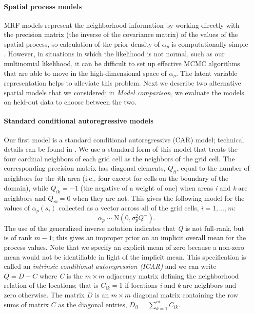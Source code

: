 \documentclass[10pt,letterpaper]{article}
\begin{document}
\paragraph*{Spatial process models}

MRF models represent the neighborhood information
by working directly with the precision matrix (the
inverse of the covariance matrix) of the values of the spatial process,
so calculation of the prior density of $\alpha_{p}$ is computationally
simple \cite{Rue:Held:2005}. However, in situations
in which the likelihood is not normal, such
as our multinomial likelihood, it can be difficult to set up effective
MCMC algorithms that are able to move in the high-dimensional space
of $\alpha_{p}$. The latent variable representation
helps to alleviate this problem. Next we describe two alternative
spatial models that we considered; in \emph{Model comparison},
we evaluate the models on held-out data to choose
between the two.

\paragraph{Standard conditional autoregressive models}

Our first model is a standard conditional autoregressive (CAR) model;
technical details can be found in \cite{Bane:etal:2004}. We use
a standard form of this model that treats the four
cardinal neighbors of each grid cell as the neighbors of the grid
cell. The corresponding precision matrix has diagonal elements, $Q_{ii}$,
equal to the number of neighbors for the \emph{i}th area (i.e., four except
for cells on the boundary of the domain), while $Q_{ik}=-1$ (the
negative of a weight of one) when areas \emph{i} and \emph{k} are neighbors
and $Q_{ik}=0$ when they are not. This gives the following model
for the values of $\alpha_{p}(s_{i})$ collected as a vector across
all of the grid cells, $i=1,\ldots,m$: 
\[
\alpha_{p}\sim\mbox{N}(0,\sigma_{p}^{2}Q^{-}).
\]
The use of the generalized inverse notation indicates that \emph{Q} is
not full-rank, but is of rank $m-1$; this gives an improper prior
on an implicit overall mean for the process values. Note
that we specify an explicit mean of zero because a non-zero mean would
not be identifiable in light of the implicit mean. This specification
is called an \textit{intrinsic conditional autoregression (ICAR)}
and we can write $Q=D-C$ where \emph{C} is the $m\times m$ adjacency
matrix defining the neighborhood relation of the locations; that is
$C{}_{ik}=1$ if locations \emph{i} and \emph{k} are neighbors and zero otherwise.
The matrix $D$ is an $m\times m$ diagonal matrix containing the
row sums of matrix $C$ as the diagonal entries, $D{}_{ii}={\displaystyle \sum_{k=1}^{m}C{}_{ik}}.$
\end{document}
